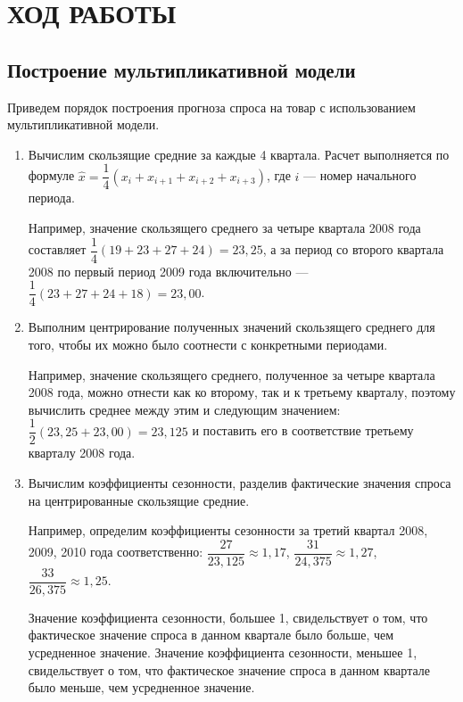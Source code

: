 \section{ХОД РАБОТЫ}

\subsection{Построение мультипликативной модели}

Приведем порядок построения прогноза спроса на товар с использованием
мультипликативной модели.

\begin{enumerate}
\item Вычислим скользящие средние за каждые 4 квартала.
  Расчет выполняется по формуле
  \( \hat{x} = \dfrac{1}{4} (x_{i} + x_{i+1} + x_{i+2} + x_{i+3}) \),
  где \( i \) --- номер начального периода.

  Например, значение скользящего среднего за четыре квартала
  2008 года составляет \( \dfrac{1}{4} (19 + 23 + 27 + 24) = 23{,}25 \),
  а за период со второго квартала 2008 по первый период 2009 года
  включительно --- \( \dfrac{1}{4} (23 + 27 + 24 + 18) = 23{,}00 \).

\item Выполним центрирование полученных значений скользящего среднего
  для того, чтобы их можно было соотнести с конкретными периодами.

  Например, значение скользящего среднего, полученное за четыре квартала
  2008 года, можно отнести как ко второму, так и к третьему кварталу,
  поэтому вычислить среднее между этим и следующим значением:
  \( \dfrac{1}{2} (23{,}25 + 23{,}00) = 23{,}125 \) и поставить его
  в соответствие третьему кварталу 2008 года.

\item Вычислим коэффициенты сезонности,
  разделив фактические значения спроса на центрированные скользящие средние.

  Например, определим коэффициенты сезонности за третий квартал
  2008, 2009, 2010 года соответственно:
  \( \dfrac{27}{23{,}125} \approx 1{,}17 \),
  \( \dfrac{31}{24{,}375} \approx 1{,}27 \),
  \( \dfrac{33}{26{,}375} \approx 1{,}25 \).
  
  Значение коэффициента сезонности, большее 1, свидельствует о том, что
  фактическое значение спроса в данном квартале было больше,
  чем усредненное значение.
  Значение коэффициента сезонности, меньшее 1, свидельствует о том, что
  фактическое значение спроса в данном квартале было меньше,
  чем усредненное значение.


\end{enumerate}
